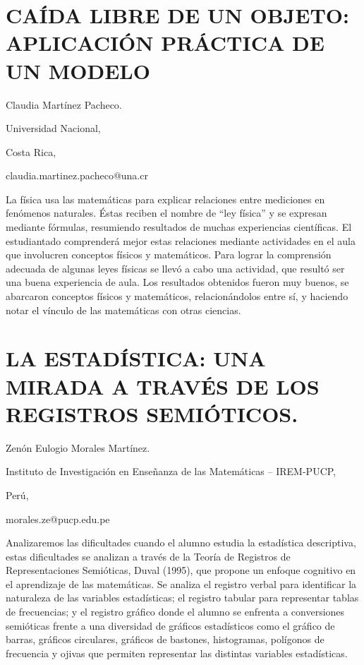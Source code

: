 \section{CAÍDA LIBRE DE UN OBJETO: APLICACIÓN PRÁCTICA DE UN MODELO}

\begin{datos}

Claudia Martínez Pacheco.

Universidad Nacional, 

Costa Rica,

claudia.martinez.pacheco@una.cr 

\end{datos}

La física usa las matemáticas para explicar relaciones entre mediciones
en fenómenos naturales. Éstas reciben el nombre de “ley física” y
se expresan mediante fórmulas, resumiendo resultados de muchas experiencias
científicas. El estudiantado comprenderá mejor estas relaciones mediante
actividades en el aula que involucren conceptos físicos y matemáticos.
Para lograr la comprensión adecuada de algunas leyes físicas se llevó
a cabo una actividad, que resultó ser una buena experiencia de aula.
Los resultados obtenidos fueron muy buenos, se abarcaron conceptos
físicos y matemáticos, relacionándolos entre sí, y haciendo notar
el vínculo de las matemáticas con otras ciencias.


\section{LA ESTADÍSTICA: UNA MIRADA A TRAVÉS DE LOS REGISTROS SEMIÓTICOS. }

\begin{datos}

Zenón Eulogio Morales Martínez. 

Instituto de Investigación en Enseñanza de las Matemáticas – IREM-PUCP,

Perú,

morales.ze@pucp.edu.pe 

\end{datos}

Analizaremos las dificultades cuando el alumno estudia la estadística
descriptiva, estas dificultades se analizan a través de la Teoría
de Registros de Representaciones Semióticas, Duval (1995), que propone
un enfoque cognitivo en el aprendizaje de las matemáticas. Se analiza
el registro verbal para identificar la naturaleza de las variables
estadísticas; el registro tabular para representar tablas de frecuencias;
y el registro gráfico donde el alumno se enfrenta a conversiones semióticas
frente a una diversidad de gráficos estadísticos como el gráfico de
barras, gráficos circulares, gráficos de bastones, histogramas, polígonos
de frecuencia y ojivas que permiten representar las distintas variables
estadísticas.



